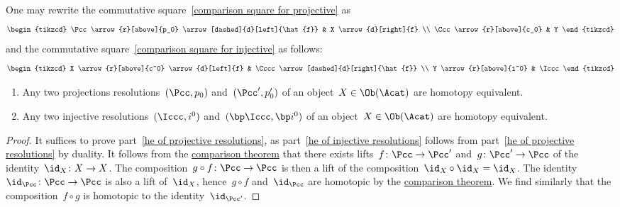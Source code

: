 \begin{remark*}
  One may rewrite the commutative square~\eqref{comparison square for projective} as
  \[
    \begin{tikzcd}
        \Pcc
        \arrow{r}[above]{p_0}
        \arrow[dashed]{d}[left]{\hat{f}}
      & X
        \arrow{d}[right]{f}
      \\
        \Ccc
        \arrow{r}[above]{c_0}
      & Y
    \end{tikzcd}
  \]
  and the commutative square~\eqref{comparison square for injective} as follows:
  \[
    \begin{tikzcd}
        X
        \arrow{r}[above]{c^0}
        \arrow{d}[left]{f}
      & \Cccc
        \arrow[dashed]{d}[right]{\hat{f}}
      \\
        Y
        \arrow{r}[above]{i^0}
      & \Iccc
    \end{tikzcd}
  \]
\end{remark*}


\begin{corollary*}
  \leavevmode
  \begin{enumerate}
    \item
      \label{he of projective resolutions}
      Any two projections resolutions~$(\Pcc, p_0)$ and~$(\Pcc', p'_0)$ of an object~$X \in \Ob(\Acat)$ are homotopy equivalent.
    \item
      \label{he of injective resolutions}
      Any two injective resolutions~$(\Iccc, i^0)$ and~$(\bp\Iccc, \bp i^0)$ of an object~$X \in \Ob(\Acat)$ are homotopy equivalent.
  \end{enumerate}
\end{corollary*}


\begin{proof}
  It suffices to prove part~\ref*{he of projective resolutions}, as part~\ref*{he of injective resolutions} follows from part~\ref*{he of projective resolutions} by duality.
  It follows from the \hyperref[comparison theorem]{comparison theorem} that there exists lifts~$f \colon \Pcc \to \Pcc'$ and~$g \colon \Pcc' \to \Pcc$ of the identity~$\id_X \colon X \to X$.
  The composition~$g \circ f \colon \Pcc \to \Pcc$ is then a lift of the composition~$\id_X \circ \id_X = \id_X$.
  The identity~$\id_{\Pcc} \colon \Pcc \to \Pcc$ is also a lift of~$\id_X$, hence~$g \circ f$ and~$\id_{\Pcc}$ are homotopic by the \hyperref[comparison theorem]{comparison theorem}.
  We find similarly that the composition~$f \circ g$ is homotopic to the identity~$\id_{\Pcc'}$.
\end{proof}


